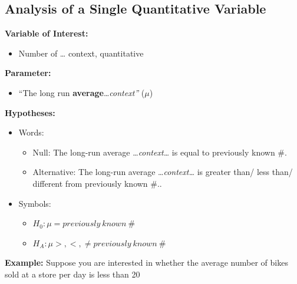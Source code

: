 \documentclass[
  letterpaper,
  DIV=11,
  numbers=noendperiod]{scrartcl}
\providecommand{\tightlist}{%
  \setlength{\itemsep}{0pt}\setlength{\parskip}{0pt}}
\begin{document}
\subsection{Analysis of a Single Quantitative
Variable}\label{analysis-of-a-single-quantitative-variable}

\textbf{Variable of Interest:}

\begin{itemize}
\tightlist
\item
  Number of \ldots{} context, quantitative
\end{itemize}

\textbf{Parameter:}

\begin{itemize}
\tightlist
\item
  ``The long run \textbf{average}\ldots{}\emph{context''} (\(\mu\))
\end{itemize}

\textbf{Hypotheses:}

\begin{itemize}
\item
  Words:

  \begin{itemize}
  \item
    Null: The long-run average \ldots{}\emph{context\ldots{}} is equal
    to previously known \#.
  \item
    Alternative: The long-run average \ldots{}\emph{context\ldots{}} is
    greater than/ less than/ different from previously known \#..
  \end{itemize}
\item
  Symbols:

  \begin{itemize}
  \item
    \(H_{0}:\mu = previously\ known\ \#\)
  \item
    \(H_{A}:\mu > , < , \neq previously\ known\ \#\)
  \end{itemize}
\end{itemize}

\textbf{Example:} Suppose you are interested in whether the average
number of bikes sold at a store per day is less than 20
\end{document}
